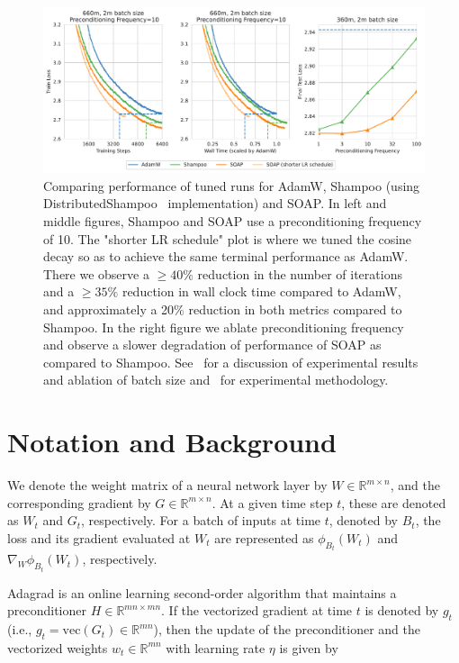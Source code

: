 \documentclass{article} %
\begin{document}
\begin{figure}
	\centering
	\includegraphics[width=1\linewidth]{figures/main_fig_2.pdf}
	\caption{Comparing performance of tuned runs for AdamW, Shampoo (using DistributedShampoo~\citep{distributedshampoo} implementation) and SOAP. In left and middle figures, Shampoo and SOAP use a preconditioning frequency of 10. The "shorter LR schedule" plot is where we tuned the cosine decay so as to achieve the same terminal performance as AdamW. There we observe a $\geq 40\%$ reduction in the number of iterations and a $\geq 35\%$ reduction in wall clock time compared to AdamW, and approximately a 20\% reduction in both metrics compared to Shampoo. In the right figure we ablate preconditioning frequency and observe a slower degradation of performance of SOAP as compared to Shampoo. See~ for a discussion of experimental results and ablation of batch size and~ for experimental methodology.}
	\label{fig:main}
\end{figure}

\section{Notation and Background}
We denote the weight matrix of a neural network layer by $W \in \mathbb{R}^{m \times n}$, and the 
corresponding gradient by $G \in \mathbb{R}^{m \times n}$. At a given time step $t$, these are denoted 
as $W_t$ and $G_t$, respectively. For a batch of inputs at time $t$, denoted 
by $B_t$, the loss and its gradient evaluated at $W_t$ are represented as 
$\phi_{B_t}(W_t)$ and $\nabla_W \phi_{B_t}(W_t)$, respectively.

Adagrad \citep{adagrad} is an online learning second-order algorithm that maintains a preconditioner $H \in \mathbb{R}^{mn \times mn}$. If the vectorized gradient at time $t$ is denoted by $g_t$ (i.e., $g_t = \text{vec}(G_t) \in \mathbb{R}^{mn}$), then the update of the preconditioner and the vectorized weights $w_t \in \mathbb{R}^{mn}$ with learning rate $\eta$ is given by
\end{document}
